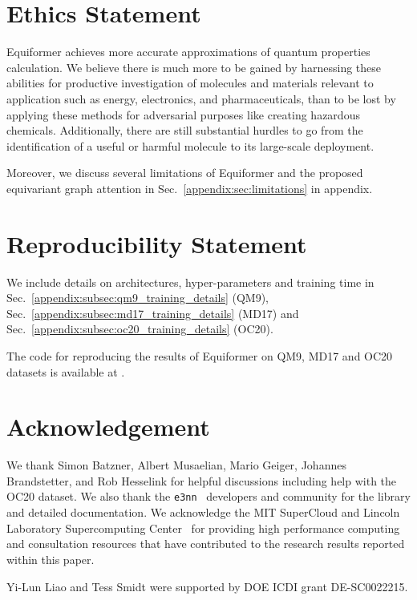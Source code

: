 \section{Ethics Statement}
Equiformer achieves more accurate approximations of quantum properties calculation.
We believe there is much more to be gained by harnessing these abilities for productive investigation of molecules and materials relevant to application such as energy, electronics, and pharmaceuticals, than to be lost by applying these methods for adversarial purposes like creating hazardous chemicals.
Additionally, there are still substantial hurdles to go from the identification of a useful or harmful molecule to its large-scale deployment.

Moreover, we discuss several limitations of Equiformer and the proposed equivariant graph attention in Sec.~\ref{appendix:sec:limitations} in appendix.


\section{Reproducibility Statement }

We include details on architectures, hyper-parameters and training time in Sec.~\ref{appendix:subsec:qm9_training_details} (QM9), Sec.~\ref{appendix:subsec:md17_training_details} (MD17) and Sec.~\ref{appendix:subsec:oc20_training_details} (OC20).

The code for reproducing the results of Equiformer on QM9, MD17 and OC20 datasets is available at \texttt{\href{https://github.com/atomicarchitects/equiformer}{\color{crimson}{https://github.com/atomicarchitects/equiformer}}}.


\section*{Acknowledgement}
We thank Simon Batzner, Albert Musaelian, Mario Geiger, Johannes Brandstetter, and Rob Hesselink for helpful discussions including help with the OC20 dataset.
We also thank the \texttt{e3nn}~\citep{e3nn} developers and community for the library and detailed documentation. 
We acknowledge the MIT SuperCloud and Lincoln Laboratory Supercomputing Center~\citep{supercloud} for providing high performance computing and consultation resources that have contributed to the research results reported within this paper.

Yi-Lun Liao and Tess Smidt were supported by DOE ICDI grant DE-SC0022215.